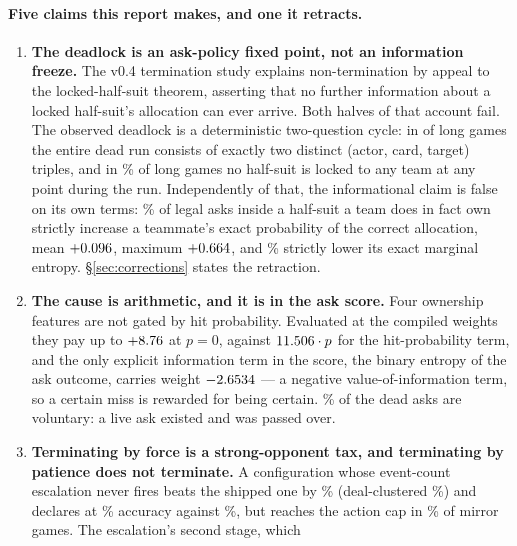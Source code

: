 \paragraph{Five claims this report makes, and one it retracts.}

\begin{enumerate}
  \item \textbf{The deadlock is an ask-policy fixed point, not an information
        freeze.} The v0.4 termination study explains non-termination by appeal to
        the locked-half-suit theorem, asserting that no further information about
        a locked half-suit's allocation can ever arrive. Both halves of that
        account fail. The observed deadlock is a deterministic two-question
        cycle: in \numPureCycle{} of \numLongGames{} long games the entire dead
        run consists of exactly two distinct (actor, card, target) triples, and
        in \numNoLockPct\% of long games no half-suit is locked to any team at
        any point during the run. Independently of that, the informational claim
        is false on its own terms: \numCertRate\% of legal asks inside a
        half-suit a team does in fact own strictly increase a teammate's exact
        probability of the correct allocation, mean $+0.096$, maximum
        $+0.664$, and \numEntropyRate\% strictly lower its exact marginal
        entropy. \S\ref{sec:corrections} states the retraction.
  \item \textbf{The cause is arithmetic, and it is in the ask score.} Four
        ownership features are not gated by hit probability. Evaluated at the
        compiled weights they pay up to $+8.76$ at $p=0$, against
        $11.506\cdot p$ for the hit-probability term, and the only
        explicit information term in the score, the binary entropy of the ask
        outcome, carries weight $-2.6534$ --- a negative
        value-of-information term, so a certain miss is rewarded for being
        certain. \numVoluntaryDead\% of the dead asks are voluntary: a live ask
        existed and was passed over.
  \item \textbf{Terminating by force is a strong-opponent tax, and terminating by
        patience does not terminate.} A configuration whose event-count
        escalation never fires beats the shipped one by \numPatientWin\%
        (deal-clustered \numPatientWinCI\%) and declares at \numPatientDeclAcc\%
        accuracy against \numForcingDeclAcc\%, but reaches the action cap in
        \numPatientCap\% of mirror games. The escalation's second stage, which

\end{enumerate}
